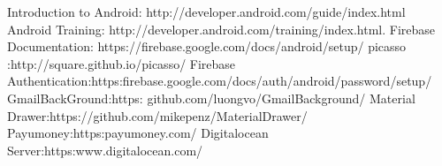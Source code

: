 \begin{thebibliography}{3}
\bibitem{} Introduction to Android: http://developer.android.com/guide/index.html
\bibitem{} Android Training: http://developer.android.com/training/index.html.
\bibitem{} Firebase Documentation: https://firebase.google.com/docs/android/setup/
\bibitem{} picasso :http://square.github.io/picasso/
\bibitem{} Firebase Authentication:https:firebase.google.com/docs/auth/android/password/setup/
\bibitem{} GmailBackGround:https: github.com/luongvo/GmailBackground/
\bibitem{} Material Drawer:https://github.com/mikepenz/MaterialDrawer/
\bibitem{} Payumoney:https:payumoney.com/
\bibitem{} Digitalocean Server:https:www.digitalocean.com/ 
\end{thebibliography}